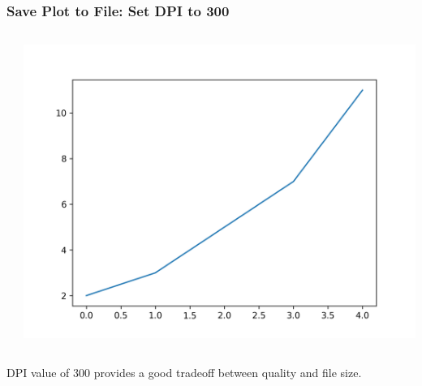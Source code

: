\documentclass[xcolor={svgnames}]{beamer}
\newcommand{\pyfile}[2][]{}
\begin{document}
\begin{frame}
    \frametitle{Save Plot to File: Set DPI to 300}
    \begin{columns}
        \begin{column}{0.52\textwidth}
            \pyfile[linerange={1-3,5-5}]{examples/01-savefig.py}
        \end{column}
        \begin{column}{0.48\textwidth}
            \includegraphics[width=\textwidth]{img/02-savefig-dpi-300.png}
        \end{column}
    \end{columns}
    \small
    \vspace{15mm}
    \hspace{-1.97mm}
    DPI value of 300 provides a good tradeoff between quality
    and file size.
\end{frame}
\end{document}
